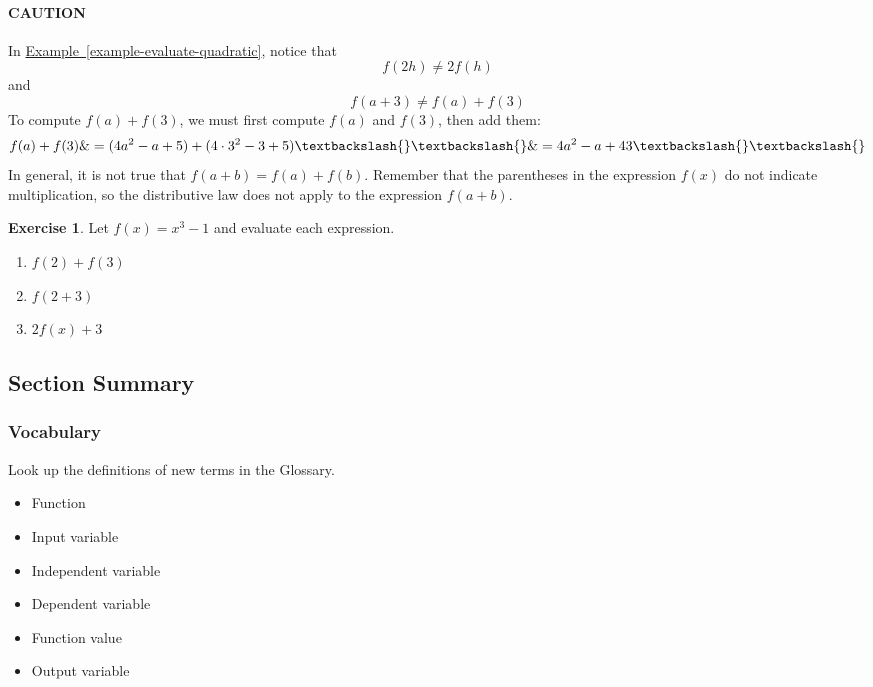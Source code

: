 \documentclass[10pt,]{book}
\theoremstyle{plain}
\theoremstyle{definition}
\theoremstyle{definition}
\theoremstyle{definition}
\newtheorem{exercise}[theorem]{Exercise}
\begin{document}
\paragraph[{CAUTION}]{CAUTION}\hypertarget{paragraphs-2}{}
In \hyperref[example-evaluate-quadratic]{Example~\ref{example-evaluate-quadratic}}, notice that%
\begin{equation*}
f(2h) \ne 2 f(h)
\end{equation*}
and%
\begin{equation*}
f(a + 3) \ne f(a) + f(3)
\end{equation*}
To compute \(f(a) + f(3)\), we must first compute \(f(a)\) and \(f(3)\), then add them: \begin{align*} f(a)+f(3)\&= (4a^2-a+5)+(4\cdot 3^2-3+5) \textbackslash{}\textbackslash{} \&= 4a^2 - a + 43\textbackslash{}\textbackslash{} \end{align*} In general, it is not true that \(f(a + b) = f(a) + f(b)\). Remember that the parentheses in the expression \(f(x)\) do not indicate multiplication, so the distributive law does not apply to the expression \(f(a + b)\).%
\begin{exercise}\label{exercise-function-notation2}
Let \(f(x) = x^3 - 1\) and evaluate each expression. \leavevmode%
\begin{enumerate}[label=\alph*]
\item\hypertarget{li-57}{}\(f(2) + f(3)\)%
\item\hypertarget{li-58}{}\(f(2 + 3)\)%
\item\hypertarget{li-59}{}\(2 f(x) + 3\)%
\end{enumerate}
\end{exercise}
\typeout{************************************************}
\typeout{************************************************}
\subsection[{Section Summary}]{Section Summary}\label{summary-1-2}
\typeout{************************************************}
\typeout{************************************************}
\subsubsection[{Vocabulary}]{Vocabulary}\label{subsubsection-1}
Look up the definitions of new terms in the Glossary. \leavevmode%
\begin{multicols}{3}
\begin{itemize}[label=\textbullet]
\item{}Function%
\item{}Input variable%
\item{}Independent variable%
\item{}Dependent variable%
\item{}Function value%
\item{}Output variable%
\end{itemize}
\end{multicols}
%
\typeout{************************************************}
\typeout{************************************************}
\end{document}

